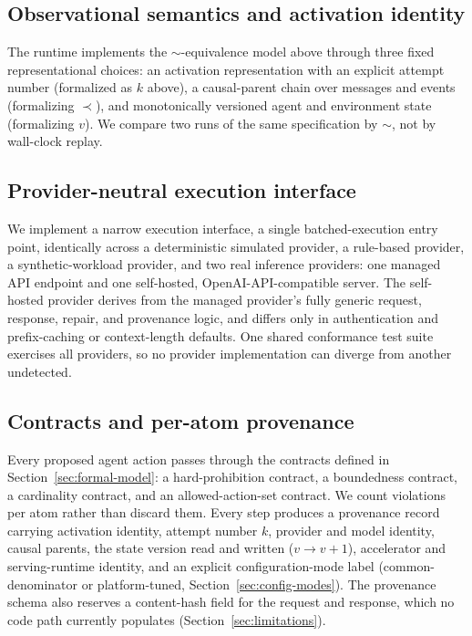 \subsection{Observational semantics and activation identity}
\label{sec:obs-semantics}

The runtime implements the $\sim$-equivalence model above through three fixed representational choices: an activation representation with an explicit attempt number (formalized as $k$ above), a causal-parent chain over messages and events (formalizing $\prec$), and monotonically versioned agent and environment state (formalizing $v$). We compare two runs of the same specification by $\sim$, not by wall-clock replay.

\subsection{Provider-neutral execution interface}
\label{sec:exec-interface}

We implement a narrow execution interface, a single batched-execution entry point, identically across a deterministic simulated provider, a rule-based provider, a synthetic-workload provider, and two real inference providers: one managed API endpoint and one self-hosted, OpenAI-API-compatible server. The self-hosted provider derives from the managed provider's fully generic request, response, repair, and provenance logic, and differs only in authentication and prefix-caching or context-length defaults. One shared conformance test suite exercises all providers, so no provider implementation can diverge from another undetected.

\subsection{Contracts and per-atom provenance}
\label{sec:contracts}

Every proposed agent action passes through the contracts defined in Section~\ref{sec:formal-model}: a hard-prohibition contract, a boundedness contract, a cardinality contract, and an allowed-action-set contract. We count violations per atom rather than discard them. Every step produces a provenance record carrying activation identity, attempt number $k$, provider and model identity, causal parents, the state version read and written ($v \to v+1$), accelerator and serving-runtime identity, and an explicit configuration-mode label (common-denominator or platform-tuned, Section~\ref{sec:config-modes}). The provenance schema also reserves a content-hash field for the request and response, which no code path currently populates (Section~\ref{sec:limitations}).


